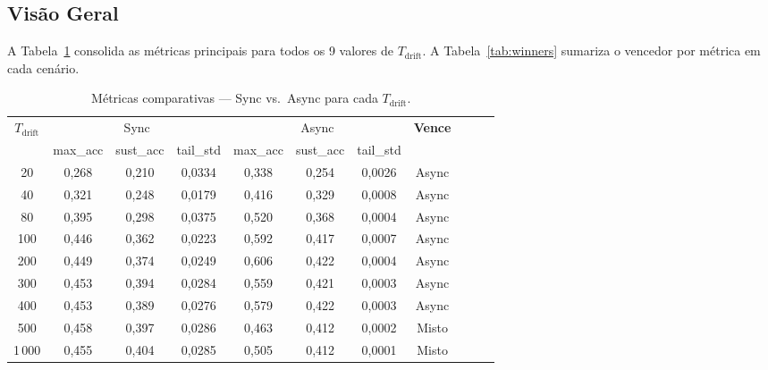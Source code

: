 \documentclass[12pt, a4paper]{article}
\begin{document}
\subsection{Visão Geral}

A Tabela~\ref{tab:all_metrics} consolida as métricas principais para todos os
9 valores de $T_{\text{drift}}$. A Tabela~\ref{tab:winners} sumariza o
vencedor por métrica em cada cenário.

\begin{table}[H]
\centering
\caption{Métricas comparativas --- Sync vs.\ Async para cada $T_{\text{drift}}$.}
\label{tab:all_metrics}
\renewcommand{\arraystretch}{1.15}
\footnotesize
\begin{tabular}{c|cccccc|cccc}
\toprule
\multirow{2}{*}{$T_{\text{drift}}$} &
  \multicolumn{3}{c}{Sync} &
  \multicolumn{3}{c|}{Async} &
  \multirow{2}{*}{\textbf{Vence}} \\
\cmidrule(lr){2-4} \cmidrule(lr){5-7}
& max\_acc & sust\_acc & tail\_std & max\_acc & sust\_acc & tail\_std \\
\midrule
20   & 0{,}268 & 0{,}210 & 0{,}0334 & 0{,}338 & 0{,}254 & 0{,}0026 & Async \\
40   & 0{,}321 & 0{,}248 & 0{,}0179 & 0{,}416 & 0{,}329 & 0{,}0008 & Async \\
80   & 0{,}395 & 0{,}298 & 0{,}0375 & 0{,}520 & 0{,}368 & 0{,}0004 & Async \\
100  & 0{,}446 & 0{,}362 & 0{,}0223 & 0{,}592 & 0{,}417 & 0{,}0007 & Async \\
200  & 0{,}449 & 0{,}374 & 0{,}0249 & 0{,}606 & 0{,}422 & 0{,}0004 & Async \\
300  & 0{,}453 & 0{,}394 & 0{,}0284 & 0{,}559 & 0{,}421 & 0{,}0003 & Async \\
400  & 0{,}453 & 0{,}389 & 0{,}0276 & 0{,}579 & 0{,}422 & 0{,}0003 & Async \\
500  & 0{,}458 & 0{,}397 & 0{,}0286 & 0{,}463 & 0{,}412 & 0{,}0002 & Misto \\
1\,000 & 0{,}455 & 0{,}404 & 0{,}0285 & 0{,}505 & 0{,}412 & 0{,}0001 & Misto \\
\bottomrule
\end{tabular}
\end{table}
\end{document}
